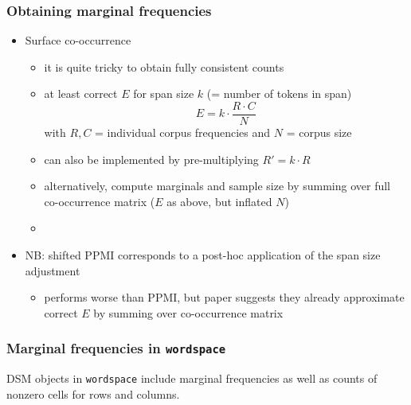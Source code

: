 \documentclass[t]{beamer} %
\begin{document}
\begin{frame}
  \frametitle{Obtaining marginal frequencies}

  \begin{itemize}
  \item Surface co-occurrence
    \begin{itemize}
    \item it is quite tricky to obtain fully consistent counts \citep{Evert:08}
    \item at least correct $E$ for span size $k$ (= number of tokens in span)
      \[
      E = k\cdot \frac{R\cdot C}{N}
      \]
      with $R, C$ = individual corpus frequencies and $N$ = corpus size
    \item can also be implemented by pre-multiplying $R' = k\cdot R$
    \item[\hand] alternatively, compute marginals and sample size by summing
      over full co-occurrence matrix (\so $E$ as above, but inflated $N$)
    \item[]
    \end{itemize}
  \item<2-> NB: shifted PPMI \citep{Levy:Goldberg:14} corresponds to a post-hoc application of the span size adjustment
    \begin{itemize}
    \item performs worse than PPMI, but paper suggests they already
      approximate correct $E$ by summing over co-occurrence matrix
    \end{itemize}
  \end{itemize}
\end{frame}

\begin{frame}[fragile]
  \frametitle{Marginal frequencies in \texttt{wordspace}}
  
  DSM objects in \texttt{wordspace} include marginal frequencies as well as
  counts of nonzero cells for rows and columns.
\end{frame}
\end{document}
